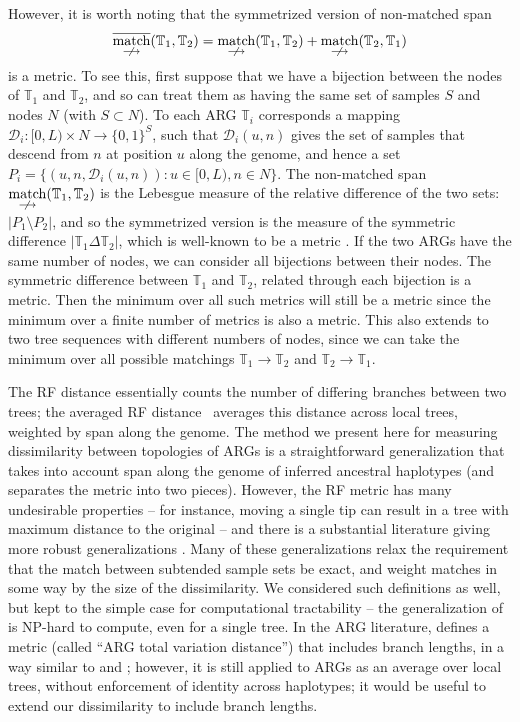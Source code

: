 \documentclass[10pt,twoside,lineno]{gsajnl}
\newcommand{\T}{\mathbb{T}}
\newcommand{\nmatch}{\underset{\centernot\longrightarrow}{\operatorname{match}}}
\begin{document}
However, it is worth noting that the symmetrized version of non-matched span
$$\overline{\nmatch}(\T_1,\T_2) = \nmatch(\T_1,\T_2) + \nmatch(\T_2, \T_1)$$
is a metric.
To see this, first suppose that we have a bijection between the nodes of $\T_1$ and $\T_2$,
and so can treat them as having the same set of samples $S$ and nodes $N$
(with $S \subset N$).
To each ARG $\T_i$ corresponds a mapping $\mathcal{D}_i : [0, L) \times N \to \{0,1\}^S$,
such that $\mathcal{D}_i(u,n)$ gives the set of samples that descend from $n$ at position $u$
along the genome,
and hence a set $P_i = \{(u,n,\mathcal{D}_i(u,n)): u \in [0,L), n \in N\}$.
The non-matched span $\nmatch(\T_1,\T_2)$
is the Lebesgue measure of the relative difference of the two sets:
$|P_1 \setminus P_2|$,
and so the symmetrized version is the measure of the symmetric difference
$|\T_1\Delta\T_2|$,
which is well-known to be a metric \citep{rudin1976principles}. 
If the two ARGs have the same number of nodes,
we can consider all bijections between their nodes.
The symmetric difference between $\T_1$ and $\T_2$,
related through each bijection is a metric.
Then the minimum over all such metrics will still be a metric
since the minimum over a finite number of metrics is also a metric.
This also extends to two tree sequences with different numbers of nodes,
since we can take the minimum over all possible matchings $\T_1\to\T_2$ and $\T_2\to\T_1$.

The RF distance \citep{robinson1981comparison}
essentially counts the number of differing branches between two trees;
the averaged RF distance~\citep{kuhner2015assessing}
averages this distance across local trees, weighted by span along the genome.
The method we present here for measuring dissimilarity between topologies of ARGs
is a straightforward generalization
that takes into account span along the genome of inferred ancestral haplotypes
(and separates the metric into two pieces).
However, the RF metric has many undesirable properties --
for instance, moving a single tip can result in a tree with maximum distance to the original --
and there is a substantial literature giving more robust generalizations
\citep[reviewed by][]{llabres2021generalized}.
Many of these generalizations \citep[e.g.,][]{bocker2013generalized}
relax the requirement that the match between subtended sample sets be exact,
and weight matches in some way by the size of the dissimilarity.
We considered such definitions as well, but kept to the simple case
for computational tractability --
the generalization of \citet{bocker2013generalized} is NP-hard to compute, even for a single tree.
In the ARG literature, \citet{zhang2023biobankscale}
defines a metric (called ``ARG total variation distance'') that includes branch lengths,
in a way similar to \citet{robinson1979comparison} and \citet{kuhner1994simulation};
however, it is still applied to ARGs as an average over local trees,
without enforcement of identity across haplotypes;
it would be useful to extend our dissimilarity to include branch lengths.
\end{document}
